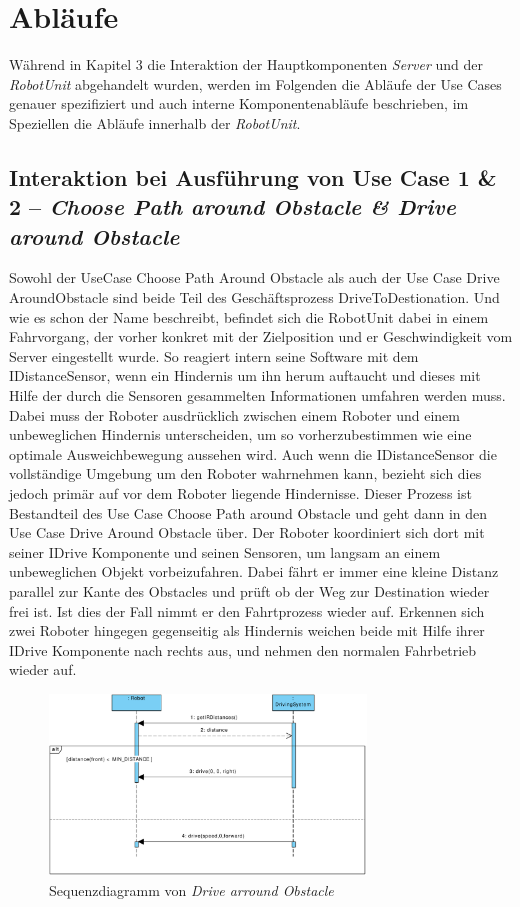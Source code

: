 \section{Abläufe}

Während in Kapitel 3 die Interaktion der Hauptkomponenten \emph{Server} und der \emph{RobotUnit} abgehandelt wurden, werden im Folgenden die Abläufe der Use Cases genauer spezifiziert und auch interne Komponentenabläufe beschrieben, im Speziellen die Abläufe innerhalb der \emph{RobotUnit}.
	
	\subsection*{Interaktion bei Ausführung von Use Case 1 \& 2 – \emph{Choose Path around Obstacle \& Drive around Obstacle}}
	Sowohl der UseCase Choose Path Around Obstacle als auch der Use Case Drive AroundObstacle sind beide Teil des Geschäftsprozess DriveToDestionation.  Und wie es schon der Name beschreibt, befindet sich die RobotUnit dabei in einem Fahrvorgang, der vorher konkret mit der Zielposition und er Geschwindigkeit vom Server eingestellt wurde. So reagiert intern seine Software mit dem IDistanceSensor, wenn ein Hindernis um ihn herum auftaucht und dieses mit Hilfe der durch die Sensoren gesammelten Informationen umfahren werden muss. Dabei muss der Roboter ausdrücklich zwischen einem Roboter und einem unbeweglichen Hindernis unterscheiden, um so vorherzubestimmen wie eine optimale Ausweichbewegung aussehen wird. Auch wenn die IDistanceSensor die vollständige Umgebung um den Roboter wahrnehmen kann, bezieht sich dies jedoch primär auf vor dem Roboter liegende Hindernisse. Dieser Prozess ist Bestandteil des Use Case Choose Path around Obstacle und geht dann in den Use Case Drive Around Obstacle über. Der Roboter koordiniert sich dort mit seiner IDrive Komponente und seinen Sensoren, um langsam an einem unbeweglichen Objekt vorbeizufahren. Dabei fährt er immer eine kleine Distanz parallel zur Kante des Obstacles und prüft ob der Weg zur Destination wieder frei ist. Ist dies der Fall nimmt er den Fahrtprozess wieder auf. Erkennen sich zwei Roboter hingegen gegenseitig als Hindernis weichen beide mit Hilfe ihrer IDrive Komponente nach rechts aus, und nehmen den normalen Fahrbetrieb wieder auf. \\
	\begin{figure}[H]
		\centering
		\includegraphics[width=0.75\textwidth]{img/1-Entwurf-8-DriveArroundObstacle}
		\caption{Sequenzdiagramm von \emph{Drive arround Obstacle}}
		\label{Umfahren von statichen Objekten}
	\end{figure}
	
